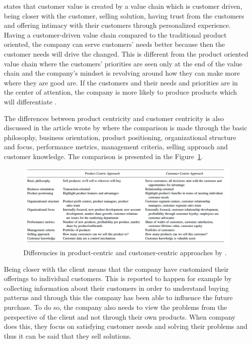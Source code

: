 \textcite{Parniangtong:2017} states that customer value is created by a value chain which is customer driven, being closer with the customer, selling solution, having trust from the customers and offering intimacy with their customers through personalized experience. Having a customer-driven value chain compared to the traditional product oriented, the company can serve customers' needs better because then the customer needs will drive the changed. This is different from the product oriented value chain where the customers' priorities are seen only at the end of the value chain and the company's mindset is revolving around how they can make more where they are good are. If the customers and their needs and priorities are in the center of attention, the company is more likely to produce products which will differentiate \parencite{Parniangtong:2017}.

The differences between product centricity and customer centricity is also discussed in the article wrote by \textcite{PathToCustomerCentricity:2006} where the comparison is made through the basic philosophy, business orientation, product positioning, organizational structure and focus, performance metrics, management criteria, selling approach and customer knowledge. The comparison is presented in the Figure~\ref{fig:productvscustomer}.

\begin{figure}[ht]
  \begin{center}
    \includegraphics[scale=2, width=\textwidth]{dippa/images/ProductVsCustomer.png}
    \caption{Differencies in product-centric and customer-centric approaches by \textcite{PathToCustomerCentricity:2006}.}
    \label{fig:productvscustomer}
  \end{center}
\end{figure}

Being closer with the client means that the company have customized their offerings to individual customers. This is reported to happen for example by collecting information about their customers in order to understand buying patterns and through this the company has been able to influence the future purchase. To do so, the company also needs to view the problems from the perspective of the client and not through their own products. When company does this, they focus on satisfying customer needs and solving their problems and thus it can be said that they sell solutions. \parencite{Parniangtong:2017}

